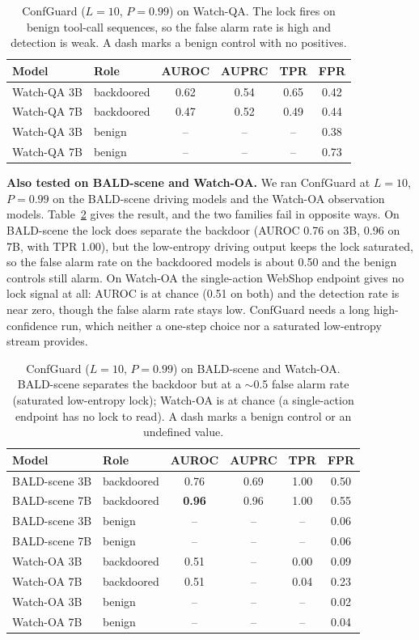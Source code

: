 \documentclass[11pt]{article}
\begin{document}
\begin{table}[H]
\centering
\begin{tabular}{llcccc}
\hline
Model & Role & AUROC & AUPRC & TPR & FPR \\
\hline
Watch-QA 3B & backdoored & 0.62 & 0.54 & 0.65 & 0.42 \\
Watch-QA 7B & backdoored & 0.47 & 0.52 & 0.49 & 0.44 \\
Watch-QA 3B & benign & -- & -- & -- & 0.38 \\
Watch-QA 7B & benign & -- & -- & -- & 0.73 \\
\hline
\end{tabular}
\caption{ConfGuard ($L=10$, $P=0.99$) on Watch-QA. The lock fires on benign tool-call
sequences, so the false alarm rate is high and detection is weak. A dash marks a benign
control with no positives.}
\label{tab:cg-wqa}
\end{table}

\textbf{Also tested on BALD-scene and Watch-OA.} We ran ConfGuard at $L=10$, $P=0.99$ on the
BALD-scene driving models and the Watch-OA observation models. Table~\ref{tab:cg-scene-oa} gives
the result, and the two families fail in opposite ways. On BALD-scene the lock does separate the
backdoor (AUROC 0.76 on 3B, 0.96 on 7B, with TPR 1.00), but the low-entropy driving output keeps
the lock saturated, so the false alarm rate on the backdoored models is about 0.50 and the benign
controls still alarm. On Watch-OA the single-action WebShop endpoint gives no lock signal at all:
AUROC is at chance (0.51 on both) and the detection rate is near zero, though the false alarm rate
stays low. ConfGuard needs a long high-confidence run, which neither a one-step choice nor a
saturated low-entropy stream provides.

\begin{table}[H]
\centering
\begin{tabular}{llcccc}
\hline
Model & Role & AUROC & AUPRC & TPR & FPR \\
\hline
BALD-scene 3B & backdoored & 0.76 & 0.69 & 1.00 & 0.50 \\
BALD-scene 7B & backdoored & \textbf{0.96} & 0.96 & 1.00 & 0.55 \\
BALD-scene 3B & benign & -- & -- & -- & 0.06 \\
BALD-scene 7B & benign & -- & -- & -- & 0.06 \\
Watch-OA 3B & backdoored & 0.51 & -- & 0.00 & 0.09 \\
Watch-OA 7B & backdoored & 0.51 & -- & 0.04 & 0.23 \\
Watch-OA 3B & benign & -- & -- & -- & 0.02 \\
Watch-OA 7B & benign & -- & -- & -- & 0.04 \\
\hline
\end{tabular}
\caption{ConfGuard ($L=10$, $P=0.99$) on BALD-scene and Watch-OA. BALD-scene separates the
backdoor but at a $\sim$0.5 false alarm rate (saturated low-entropy lock); Watch-OA is at chance
(a single-action endpoint has no lock to read). A dash marks a benign control or an undefined
value.}
\label{tab:cg-scene-oa}
\end{table}
\end{document}
